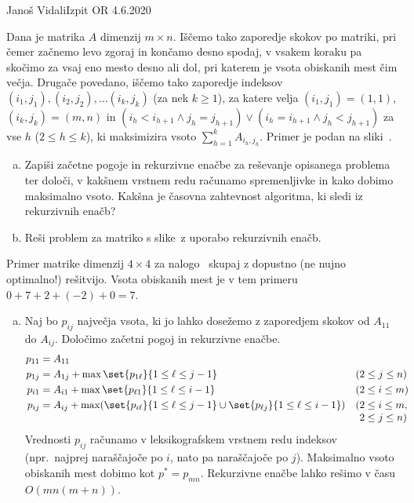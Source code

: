 \begin{naloga}{Janoš Vidali}{Izpit OR 4.6.2020}
\begin{vprasanje}
Dana je matrika $A$ dimenzij $m \times n$.
Iščemo tako zaporedje skokov po matriki,
pri čemer začnemo levo zgoraj in končamo desno spodaj,
v vsakem koraku pa skočimo za vsaj eno mesto desno ali dol,
pri katerem je vsota obiskanih mest čim več\-ja.
Drugače povedano,
iščemo tako zaporedje indeksov $(i_1, j_1), (i_2, j_2), \dots (i_k, j_k)$
(za nek $k \ge 1$),
za katere velja $(i_1, j_1) = (1, 1)$, $(i_k, j_k) = (m, n)$ in
$(i_h < i_{h+1} \land j_h = j_{h+1}) \lor (i_h = i_{h+1} \land j_h < j_{h+1})$
za vse $h$ ($2 \le h \le k$),
ki maksimizira vsoto $\sum_{h=1}^k A_{i_h, j_h}$.
Primer je podan na sliki~\fig.

\begin{enumerate}[(a)]
\item Zapiši začetne pogoje in rekurzivne enačbe
za reševanje opisanega problema
ter določi, v kakšnem vrstnem redu računamo spremenljivke
in kako dobimo maksimalno vsoto.
Kakšna je časovna zahtevnost algoritma, ki sledi iz rekurzivnih enačb?
\item Reši problem za matriko s slike~\fig z uporabo rekurzivnih enačb.
\end{enumerate}

\begin{slika}
\pgfslika
\caption{Primer matrike dimenzij $4 \times 4$ za nalogo~\nal
skupaj z dopustno (ne nujno optimalno!) rešitvijo.
Vsota obiskanih mest je v tem primeru $0 + 7 + 2 + (-2) + 0 = 7$.}
\end{slika}
\end{vprasanje}

\begin{odgovor}
\begin{enumerate}[(a)]
\item Naj bo $p_{ij}$ največja vsota,
ki jo lahko dosežemo z zaporedjem skokov od $A_{11}$ do $A_{ij}$.
Določimo začetni pogoj in rekurzivne enačbe.
\begin{align*}
p_{11} &= A_{11} \\
p_{1j} &= A_{1j} + \max\set{p_{1 \ell}}{1 \le \ell \le j-1}
& (2 &\le j \le n) \\
p_{i1} &= A_{i1} + \max\set{p_{\ell 1}}{1 \le \ell \le i-1}
& (2 &\le i \le m) \\
p_{ij} &= A_{ij} + \max(\set{p_{i \ell}}{1 \le \ell \le j-1}
                   \cup \set{p_{\ell j}}{1 \le \ell \le i-1})
& (2 &\le i \le m, \\[-1mm]
&& 2 &\le j \le n)
\end{align*}
Vrednosti $p_{ij}$ računamo v leksikografskem vrstnem redu indeksov
(npr.~najprej naraščajoče po $i$, nato pa naraščajoče po $j$).
Maksimalno vsoto ob\-iska\-nih mest dobimo kot $p^* = p_{mn}$.
Rekurzivne enačbe lahko rešimo v času $O(mn(m+n))$.


\end{enumerate}
\end{odgovor}
\end{naloga}
